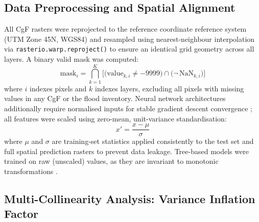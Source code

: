\documentclass[12pt, a4paper]{article}
\begin{document}
\subsection{Data Preprocessing and Spatial Alignment}

All CgF rasters were reprojected to the reference coordinate reference system (UTM Zone 45N, WGS84) and resampled using nearest-neighbour interpolation via \texttt{rasterio.warp.reproject()} \citep{gillies2019} to ensure an identical grid geometry across all layers. A binary valid mask was computed:
\begin{equation}
    \text{mask}_{i} = \bigcap_{k=1}^{K}\Big[\big(\text{value}_{k,i} \neq -9999\big) \cap \big(\neg\,\text{NaN}_{k,i}\big)\Big]
\end{equation}
where $i$ indexes pixels and $k$ indexes layers, excluding all pixels with missing values in any CgF or the flood inventory. Neural network architectures additionally require normalised inputs for stable gradient descent convergence \citep{lecun2012, Goodfellow2016}; all features were scaled using zero-mean, unit-variance standardisation:
\begin{equation}
    x' = \frac{x - \mu}{\sigma}
\end{equation}
where $\mu$ and $\sigma$ are training-set statistics applied consistently to the test set and full spatial prediction rasters to prevent data leakage. Tree-based models were trained on raw (unscaled) values, as they are invariant to monotonic transformations \citep{breiman2001}.

\subsection{Multi-Collinearity Analysis: Variance Inflation Factor}
\end{document}
